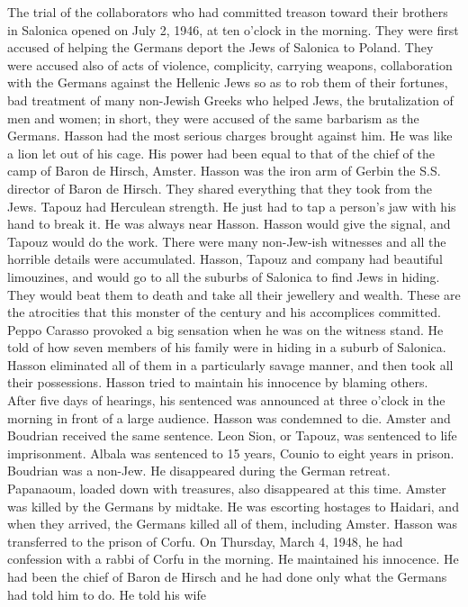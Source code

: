 The trial of the collaborators who had committed treason toward 
their brothers in Salonica opened on July 2, 1946, at ten o'clock in the 
morning. They were first accused of helping the Germans deport the Jews 
of Salonica to Poland. They were accused also of acts of violence, complicity, carrying weapons, collaboration with the Germans against the 
Hellenic Jews so as to rob them of their fortunes, bad treatment of many 
non-Jewish Greeks who helped Jews, the brutalization of men and women; 
in short, they were accused of the same barbarism as the Germans. Hasson had the most serious charges brought against him. He was like a lion let out of his cage. His power had been equal to that of the chief of
the camp of Baron de Hirsch, Amster. Hasson was the iron arm of Gerbin 
the S.S. director of Baron de Hirsch. They shared everything that they 
took from the Jews. 
Tapouz had Herculean strength. He just had to tap a person's jaw 
with his hand to break it. He was always near Hasson. Hasson would 
give the signal, and Tapouz would do the work. There were many non-Jew-ish witnesses and all the horrible details were accumulated. Hasson, Tapouz and company had beautiful limouzines, and would go to all the suburbs of Salonica to find Jews in hiding. They would beat them to death 
and take all their jewellery and wealth. These are the atrocities that 
this monster of the century and his accomplices committed. 
Peppo Carasso provoked a big sensation when he was on the witness 
stand. He told of how seven members of his family were in hiding in a 
suburb of Salonica. Hasson eliminated all of them in a particularly savage manner, and then took all their possessions. 
Hasson tried to maintain his innocence by blaming others. After 
five days of hearings, his sentenced was announced at three o'clock in 
the morning in front of a large audience. Hasson was condemned to die.
 Amster and Boudrian received the same sentence. Leon Sion, or Tapouz, 
was sentenced to life imprisonment. Albala was sentenced to 15 years, 
Counio to eight years in prison. Boudrian was a non-Jew. He disappeared during the German retreat. Papanaoum, loaded down with treasures, 
also disappeared at this time. Amster was killed by the Germans by midtake. He was escorting hostages to Haidari, and when they arrived, the 
Germans killed all of them, including Amster. 
Hasson was transferred to the prison of Corfu. On Thursday, March 
4, 1948, he had confession with a rabbi of Corfu in the morning. He 
maintained his innocence. He had been the chief of Baron de Hirsch and 
he had done only what the Germans had told him to do. He told his wife 
